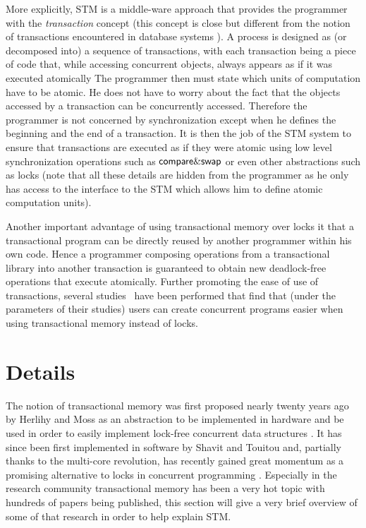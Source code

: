 More explicitly,  STM  is a middle-ware approach that provides the 
programmer  with the {\it transaction} concept (this concept 
is close but different from the notion of transactions encountered in 
database systems \cite{FFGH08,HCUAGSV07,HL08}).
 A process is designed as 
(or decomposed into)  a sequence of transactions, with each transaction 
being a piece  of code that, while  accessing  concurrent  objects, 
always  appears as if it was  executed atomically
The programmer then must state which  units of computation
have  to be atomic.  He does not have to worry about the fact that the 
objects accessed by  a transaction can be concurrently accessed. 
Therefore the programmer is not concerned by synchronization
except when he defines the beginning and the end of a  transaction.
It  is then the job of the 
STM system to ensure that transactions are executed as if they were atomic using low level synchronization
operations such as $\lit{compare\&swap}$ or even other abstractions such as locks
(note that all these details are hidden from the programmer as he only has access to the interface
to the STM which allows him to define atomic computation units).

Another important advantage of using transactional memory over locks it that a transactional program
can be directly reused by another programmer within his own code.
Hence a programmer composing operations from a transactional library into another 
transaction is guaranteed to obtain new deadlock-free operations that execute atomically.
Further promoting the ease of use of transactions, several studies~\cite{PA11,RHW10}
have been performed that find that (under the parameters of their studies) users can create concurrent programs
easier when using transactional memory instead of locks.




\section{Details}
\label{sec:details}
The notion  of   transactional  memory  was
first   proposed  nearly twenty years ago by Herlihy  and Moss 
as an abstraction to be implemented in hardware and be used in order to easily 
implement lock-free concurrent  data structures  \cite{HM93}.  It  has  since  been 
first implemented in software  by Shavit  and  Touitou   \cite{ST97} and, partially thanks
to the multi-core revolution,  has
recently gained great  momentum as  a promising alternative  to locks in
concurrent programming  \cite{FFGH08,HCUAGSV07,LK08,R08}.
Especially in the research community transactional memory has been a very hot topic with hundreds
of papers being published, this section will give a very brief overview of some of that research
in order to help explain STM.


